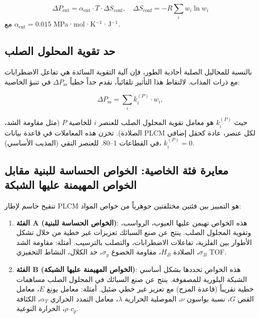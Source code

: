 \documentclass[11pt,a4paper]{article}
\begin{document}
\begin{otherlanguage}{arabic}
		\begin{equation}
			\Delta P_{\text{ent}} = \alpha_{\text{ent}} \cdot T \cdot \Delta S_{\text{conf}}, \quad
			\Delta S_{\text{conf}} = -R \sum_i w_i \ln w_i
		\end{equation}
		مع \(\alpha_{\text{ent}} = 0.015\) MPa·mol·K\(^{-1}\)·J\(^{-1}\).
		
		\subsection{حد تقوية المحلول الصلب}
		\label{subsec:ss-term}
		
		بالنسبة للمحاليل الصلبة أحادية الطور، فإن آلية التقوية السائدة هي تفاعل الاضطرابات مع ذرات المذاب. لالتقاط هذا التأثير تلقائياً، نقدم حداً خطياً \(\Delta P_{\text{ss}}\) في تنبؤ الخاصية:
		
		\begin{equation}
			\Delta P_{\text{ss}} = \sum_i k_i^{(P)} \cdot w_i,
			\label{eq:ss-term}
		\end{equation}
		
		حيث \(k_i^{(P)}\) هو معامل تقوية المحلول الصلب للعنصر \(i\) للخاصية \(P\) (مثل مقاومة الشد، الصلادة). تخزن هذه المعاملات في قاعدة بيانات PLCM لكل عنصر، عادة كحقل إضافي في القطاعات 1–80. للعنصر النقي (المذيب الأساسي)، \(k_i^{(P)} = 0\).
		
		\subsection{معايرة فئة الخاصية: الخواص الحساسة للبنية مقابل الخواص المهيمنة عليها الشبكة}
		\label{subsec:property-class-calibration}
		
		تنقيح حاسم لإطار PLCM هو التمييز بين فئتين مختلفتين جوهرياً من خواص المواد:
		
		\begin{enumerate}
			\item \textbf{الفئة A (الخواص الحساسة للبنية)}: هذه الخواص تهيمن عليها العيوب، الرواسب، وتقوية المحلول الصلب. ينتج عن صنع السبائك تعزيزات غير خطية من خلال تشكل الأطوار بين الفلزية، تفاعلات الاضطرابات، والتصلب بالترسيب. أمثلة: مقاومة الشد \(\sigma_B\)، الصلادة \(H_B\)، مقاومة الخضوع \(\sigma_y\)، حد الكلال، النشاط التحفيزي TOF.
			
			\item \textbf{الفئة B (الخواص المهيمنة عليها الشبكة)}: هذه الخواص تحددها بشكل أساسي الشبكة البلورية للمصفوفة. ينتج عن صنع السبائك في المحلول الصلب مساهمات خطية تقريباً (قاعدة المزج) مع تعزيز غير خطي ضئيل. أمثلة: معامل يونغ \(E\)، معامل القص \(G\)، نسبة بواسون \(\nu\)، الموصلية الحرارية \(\lambda\)، معامل التمدد الحراري \(\alpha_T\)، الكثافة \(\rho\)، الحرارة النوعية \(c_p\).
		\end{enumerate}
		

\end{otherlanguage}
\end{document}
